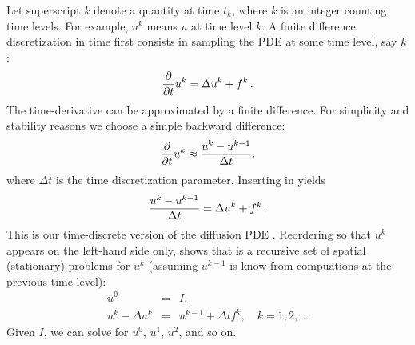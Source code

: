 Let superscript $k$ denote
a quantity at time $t_k$,
where $k$ is an integer counting time levels. For example, $u^k$ means
$u$ at time level $k$.
A finite difference discretization in time first consists in
sampling the PDE at some time level, say $k$:
\begin{equation} {\partial \over\partial t}u^k = \Delta u^k + f^k\thinspace .
\label{langtangen:diffusion:pde1:tk}
\end{equation}
The time-derivative can be approximated by a finite difference.
For simplicity and stability reasons we choose a
simple backward difference:
\begin{equation} {\partial \over\partial t}u^k\approx {u^k - u^{k-1}\over\Delta t},
\label{langtangen:diffusion:BE}
\end{equation}
where $\Delta t$ is the time discretization parameter.
Inserting  in 
yields
\begin{equation}
{u^k - u^{k-1}\over\Delta t} = \Delta u^k + f^k\thinspace .
\label{langtangen:diffusion:pde1:BE}
\end{equation}
This is our time-discrete version of the diffusion PDE .
Reordering  so that $u^k$ appears
on the left-hand side only, shows that 
is a recursive set of
spatial (stationary) problems for $u^k$ (assuming $u^{k-1}$ is know from
compuations at the previous time level):
\begin{eqnarray}
u^0 &=& I,\label{langtangen:diffusion:pde1:u0}\\
u^k - \Delta u^k &=&  u^{k-1} + \Delta t f^k,\quad k=1,2,\ldots
\label{langtangen:diffusion:pde1:uk}
\end{eqnarray}
Given $I$, we can solve for $u^0$, $u^1$, $u^2$, and so on.

